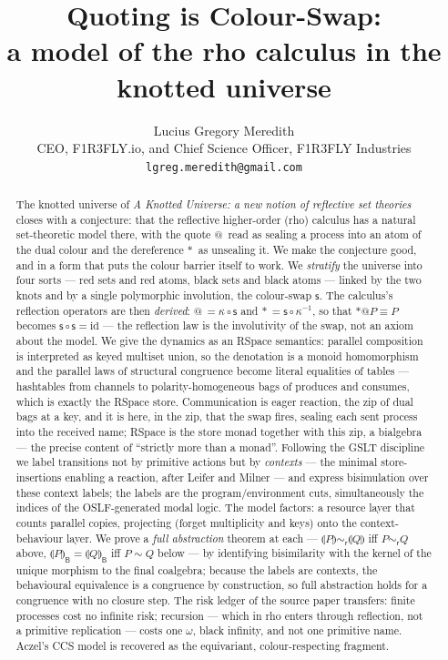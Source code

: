 \documentclass[11pt]{article}
\title{\bf Quoting is Colour-Swap:\\ a model of the rho calculus in the knotted universe}
\author{Lucius Gregory Meredith\\[2pt]
\small CEO, F1R3FLY.io, and Chief Science Officer, F1R3FLY Industries\\
\small \texttt{lgreg.meredith@gmail.com}}
\date{}
\makeatletter
\newcommand{\swp}{\mathsf{s}}                  %
\newcommand{\kt}{\kappa}                       %
\newcommand{\drp}[1]{{\ast}#1}
\newcommand{\quo}[1]{@#1}
\newcommand{\B}{\mathsf{B}}
\newcommand{\sem}[1]{\llparenthesis #1\rrparenthesis}   %
\newcommand{\bis}{\sim}
\newcommand{\scong}{\equiv}
\newcommand{\resbis}{\sim_{\mathsf{r}}}        %
\theoremstyle{plain}
\theoremstyle{definition}
\makeatother
\begin{document}
\maketitle

\begin{abstract}
The knotted universe of \emph{A Knotted Universe: a new notion of reflective set
theories} closes with a conjecture: that the reflective higher-order (rho)
calculus has a natural set-theoretic model there, with the quote $\quo{\,}$ read
as sealing a process into an atom of the dual colour and the dereference
$\drp{\,}$ as unsealing it. We make the conjecture good, and in a form that puts
the colour barrier itself to work. We \emph{stratify} the universe into four
sorts --- red sets and red atoms, black sets and black atoms --- linked by the two
knots and by a single polymorphic involution, the colour-swap $\swp$. The
calculus's reflection operators are then \emph{derived}: $\quo{\,}=\kt\circ\swp$
and $\drp{\,}=\swp\circ\kt^{-1}$, so that $\drp{\quo P}\scong P$ becomes
$\swp\circ\swp=\mathrm{id}$ --- the reflection law is the involutivity of the
swap, not an axiom about the model. We give the dynamics as an RSpace semantics:
parallel composition is interpreted as keyed multiset union, so the denotation is a
monoid homomorphism and the parallel laws of structural congruence become literal
equalities of tables --- hashtables from channels to polarity-homogeneous bags of
produces and consumes, which is exactly the RSpace store. Communication is eager
reaction, the zip of dual bags at a key, and it is here, in the zip, that the swap
fires, sealing each sent process into the received name; RSpace is the store monad
together with this zip, a bialgebra --- the precise content of ``strictly more than
a monad''. Following the GSLT discipline we label transitions not by primitive
actions but by \emph{contexts} --- the minimal store-insertions enabling a
reaction, after Leifer and Milner --- and express bisimulation over these context
labels; the labels are the program/environment cuts, simultaneously the indices of
the OSLF-generated modal logic. The model factors: a resource layer that counts
parallel copies, projecting (forget multiplicity and keys) onto the
context-behaviour layer. We prove a \emph{full abstraction} theorem at each ---
$\sem P\resbis\sem Q$ iff $P\resbis Q$ above, $\sem P_{\B}=\sem Q_{\B}$ iff $P\bis
Q$ below --- by identifying bisimilarity with the kernel of the unique morphism to
the final coalgebra; because the labels are contexts, the behavioural equivalence
is a congruence by
construction, so full abstraction holds for a congruence with no closure step. The
risk ledger of the source paper transfers: finite processes cost no infinite risk;
recursion --- which in rho enters through reflection, not a primitive replication
--- costs one $\omega$, black infinity, and not one primitive name. Aczel's CCS
model is recovered as the equivariant, colour-respecting fragment.
\end{abstract}
\end{document}
